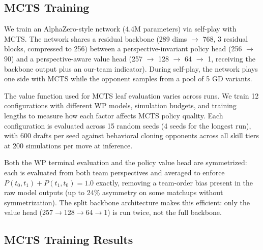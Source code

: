 \documentclass[journal]{IEEEtran}
\begin{document}
\subsection{MCTS Training}

We train an AlphaZero-style network (4.4M parameters) via self-play with MCTS. The network shares a residual backbone (289 dims $\to$ 768, 3 residual blocks, compressed to 256) between a perspective-invariant policy head (256 $\to$ 90) and a perspective-aware value head (257 $\to$ 128 $\to$ 64 $\to$ 1, receiving the backbone output plus an our-team indicator). During self-play, the network plays one side with MCTS while the opponent samples from a pool of 5 GD variants.

The value function used for MCTS leaf evaluation varies across runs. We train 12 configurations with different WP models, simulation budgets, and training lengths to measure how each factor affects MCTS policy quality. Each configuration is evaluated across 15 random seeds (4 seeds for the longest run), with 600 drafts per seed against behavioral cloning opponents across all skill tiers at 200 simulations per move at inference.

Both the WP terminal evaluation and the policy value head are symmetrized: each is evaluated from both team perspectives and averaged to enforce $P(t_0, t_1) + P(t_1, t_0) = 1.0$ exactly, removing a team-order bias present in the raw model outputs (up to 24\% asymmetry on some matchups without symmetrization). The split backbone architecture makes this efficient: only the value head (257$\to$128$\to$64$\to$1) is run twice, not the full backbone.

\subsection{MCTS Training Results}
\end{document}
